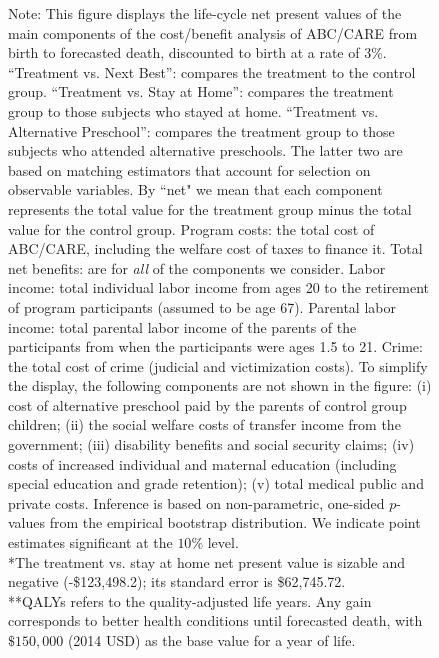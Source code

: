 \begin{figure}
\begin{subfigure}[h]{0.5\textwidth}
\end{subfigure}
\footnotesize \justify
Note: This figure displays the life-cycle net present values of the main components of the cost/benefit analysis of ABC/CARE from birth to forecasted death, discounted to birth at a rate of 3\%. ``Treatment vs. Next Best'': compares the treatment to the control group. ``Treatment vs. Stay at Home'': compares the treatment group to those subjects who stayed at home. ``Treatment vs. Alternative Preschool'': compares the treatment group to those subjects who attended alternative preschools. The latter two are based on matching estimators that account for selection on observable variables. By ``net" we mean that each component represents the total value for the treatment group minus the total value for the control group. Program costs: the total cost of ABC/CARE, including the welfare cost of taxes to finance it. Total net benefits: are for \textit{all} of the components we consider. Labor income: total individual labor income from ages 20 to the retirement of program participants (assumed to be age 67). Parental labor income: total parental labor income of the parents of the participants from when the participants were ages 1.5 to 21. Crime: the total cost of crime (judicial and victimization costs). To simplify the display, the following components are not shown in the figure: (i) cost of alternative preschool paid by the parents of control group children; (ii) the social welfare costs of transfer income from the government; (iii) disability benefits and social security claims; (iv) costs of increased individual and maternal education (including special education and grade retention); (v) total medical public and private costs. Inference is based on non-parametric, one-sided $p$-values from the empirical bootstrap distribution. We indicate point estimates significant at the $10\%$ level.\\
*The treatment vs. stay at home net present value is sizable and negative (-\$123,498.2); its standard error is \$62,745.72.\\
**QALYs refers to the quality-adjusted life years. Any gain corresponds to better health conditions until forecasted death, with $\$150,000$ (2014 USD) as the base value for a year of life.
\end{figure} 